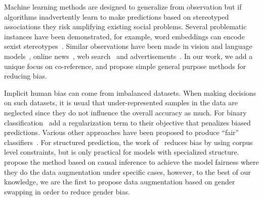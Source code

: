 Machine learning methods are designed to generalize from observation but if algorithms inadvertently learn to make predictions based on stereotyped associations they risk amplifying existing social problems.
%
Several problematic instances have been demonstrated, for example, word embeddings can encode sexist stereotypes~\cite{BCWS16,CBN17}.
Similar observations have been made in vision and language models~\cite{ZWYOC17}, online news~\cite{ross2011women}, web search~\cite{kay2015unequal} and advertisements~\cite{sweeney2013discrimination}. %
In our work, we add a unique focus on co-reference, and propose simple general purpose methods for reducing bias.

Implicit human bias can come from imbalanced datasets.
When making decisions on such datasets, it is usual that under-represented samples in the data are neglected since they do not influence the overall accuracy as much.
For binary classification~\citet{kamishima2012fairness,kamishima2011fairness} add a regularization term to their objective that penalizes biased predictions. 
Various other approaches have been proposed to produce ``fair'' classifiers~\cite{calders2009building,feldman2015certifying,misra2016seeing}. 
For structured prediction, the work of~\citet{ZWYOC17} reduces bias by using corpus level constraints, but is only practical for models with specialized structure.
\citet{kusner2017counterfactual} propose the method based on  causal inference to achieve the model fairness where they do the data augmentation under specific cases, however,  to the best of our knowledge, we are the first to propose data augmentation based on gender swapping in order to reduce gender bias. 

